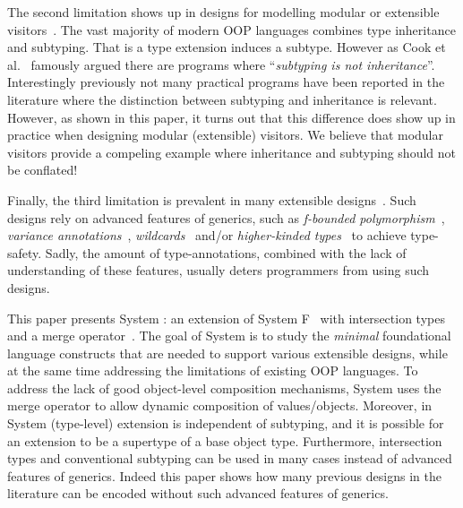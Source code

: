   The second limitation shows up in designs for modelling
  modular or extensible visitors~\cite{oliveira09modular}.  The vast majority of modern
  OOP languages combines type inheritance and subtyping. 
  That is a type extension induces a subtype. However
  as Cook et al.~\cite{cook1989inheritance} famously argued there are programs where
  ``\emph{subtyping is not inheritance}''. Interestingly previously
  not many practical programs have been reported in the literature
  where the distinction between subtyping and inheritance is
  relevant. However, as shown in this paper, it turns out that this
  difference does show up in practice when designing modular
  (extensible) visitors.  We believe that modular visitors provide a
  compeling example where inheritance and subtyping should
  not be conflated!

  Finally, the third limitation is prevalent in many extensible
  designs~\cite{togersen:2004,Zenger-Odersky2005,oliveira09modular,oliveira2013feature,rendel14attributes}.
  Such designs rely on advanced features of generics,
  such as \emph{f-bounded polymorphism}~\cite{Canning89f-bounded}, \emph{variance
    annotations}~\cite{Igarashi06variant}, \emph{wildcards}~\cite{Torgersen04wildcards} and/or \emph{higher-kinded
    types}~\cite{Moors08generics} to achieve type-safety. Sadly, the amount of
  type-annotations, combined with the lack of understanding of these
  features, usually deters programmers from using such designs.

\begin{comment}
Motivated by the insights gained in previous work, this paper presents 
a minimal core calculus that addresses current limitations and
provides a better foundational model for statically typed
delegation-based OOP? We show that Object Algebras fit nicely in this
model. 
\end{comment}

This paper presents System \name: an extension of System F~\cite{Reynolds74f}
with intersection types and a merge operator~\cite{dunfield2014elaborating}.  The goal of
System \name is to study the \emph{minimal} foundational language
constructs that are needed to support various extensible designs,
while at the same time addressing the limitations of existing OOP
languages. To address the lack of good object-level composition
mechanisms, System \name uses the merge operator to allow dynamic
composition of values/objects. Moreover, in System \name (type-level)
extension is independent of subtyping, and it is possible for an
extension to be a supertype of a base object type. Furthermore,
intersection types and conventional subtyping can be used in many
cases instead of advanced features of generics. Indeed this paper 
shows how many previous designs in the literature can be encoded 
without such advanced features of generics.


